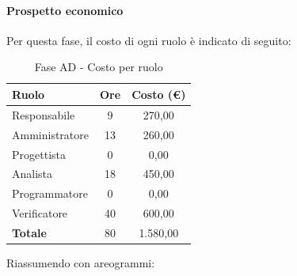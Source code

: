 \documentclass[../PianoProgetto.tex]{subfiles}
\begin{document}
\vfill
	
	\paragraph{Prospetto economico}
					Per questa fase, il costo di ogni ruolo è indicato di seguito:
					\begin{table}[h]
		\centering
	
		\begin{tabular}{l * {2}{c}}
			\toprule
			\textbf{Ruolo} & \textbf{Ore} & \textbf{Costo (\euro{})} \\
			\midrule
			Responsabile &	9 & 270,00 \\
			Amministratore & 13 & 260,00 \\
			Progettista & 0 & 0,00 \\
			Analista & 18 & 450,00 \\
			Programmatore & 0 & 0,00 \\
			Verificatore & 40 & 600,00 \\
			\midrule		
			\textbf{Totale} & 80 & 1.580,00 \\
			\bottomrule
		\end{tabular}
		\caption{Fase AD - Costo per ruolo}
		\label{tab:faseAD_costo}
	\end{table}
\vfill
\newpage
	
	Riassumendo con areogrammi:
\end{document}
